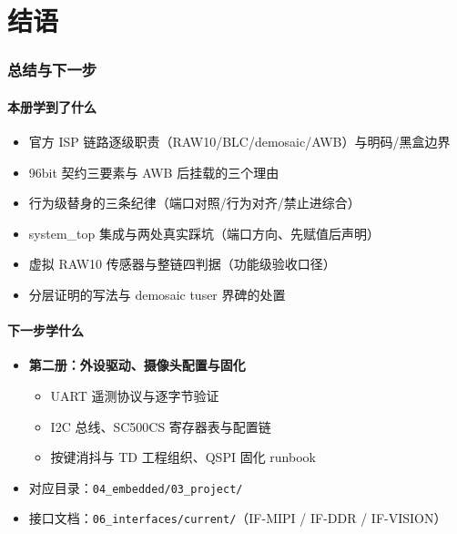 \documentclass[11pt]{ctexart}
\newcommand{\code}[1]{\texttt{#1}}
\begin{document}
\part*{结语}
\clearpage
\section*{总结与下一步}

\subsection*{本册学到了什么}
\begin{itemize}
  \item 官方 ISP 链路逐级职责（RAW10/BLC/demosaic/AWB）与明码/黑盒边界
  \item 96bit 契约三要素与 AWB 后挂载的三个理由
  \item 行为级替身的三条纪律（端口对照/行为对齐/禁止进综合）
  \item system\_top 集成与两处真实踩坑（端口方向、先赋值后声明）
  \item 虚拟 RAW10 传感器与整链四判据（功能级验收口径）
  \item 分层证明的写法与 demosaic tuser 界碑的处置
\end{itemize}

\subsection*{下一步学什么}
\begin{itemize}
  \item \textbf{第二册：外设驱动、摄像头配置与固化}
  \begin{itemize}
    \item UART 遥测协议与逐字节验证
    \item I2C 总线、SC500CS 寄存器表与配置链
    \item 按键消抖与 TD 工程组织、QSPI 固化 runbook
  \end{itemize}
  \item 对应目录：\code{04\_embedded/03\_project/}
  \item 接口文档：\code{06\_interfaces/current/}（IF-MIPI / IF-DDR / IF-VISION）
\end{itemize}
\end{document}
